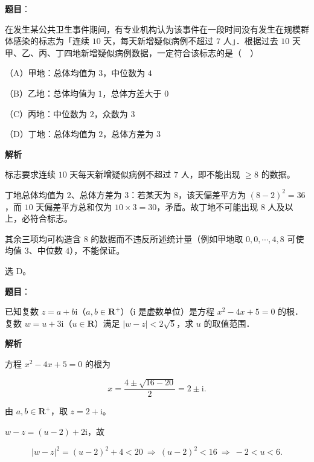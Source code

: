 \begin{answer}

\textbf{题目}：

在发生某公共卫生事件期间，有专业机构认为该事件在一段时间没有发生在规模群体感染的标志为「连续 $10$ 天，每天新增疑似病例不超过 $7$ 人」．根据过去 $10$ 天甲、乙、丙、丁四地新增疑似病例数据，一定符合该标志的是（　）

（A）甲地：总体均值为 $3$，中位数为 $4$

（B）乙地：总体均值为 $1$，总体方差大于 $0$

（C）丙地：中位数为 $2$，众数为 $3$

（D）丁地：总体均值为 $2$，总体方差为 $3$

\textbf{解析}

标志要求连续 $10$ 天每天新增疑似病例不超过 $7$ 人，即不能出现 $\geqslant8$ 的数据。

丁地总体均值为 $2$、总体方差为 $3$：若某天为 $8$，该天偏差平方为 $(8-2)^2=36$，而 $10$ 天偏差平方总和仅为 $10\times3=30$，矛盾。故丁地不可能出现 $8$ 人及以上，必符合标志。

其余三项均可构造含 $8$ 的数据而不违反所述统计量（例如甲地取 $0,0,\cdots,4,8$ 可使均值 $3$、中位数 $4$），不能保证。

选 D。


\end{answer}
\begin{answer}

\textbf{题目}：

已知复数 $z=a+b\mathrm i$（$a,b\in\mathbf R^+$）（$\mathrm i$ 是虚数单位）是方程 $x^2-4x+5=0$ 的根．复数 $w=u+3\mathrm i$（$u\in\mathbf R$）满足 $|w-z|<2\sqrt5$，求 $u$ 的取值范围．

\textbf{解析}

方程 $x^2-4x+5=0$ 的根为

\nopagebreak[4]
\[x=\frac{4\pm\sqrt{16-20}}{2}=2\pm\mathrm i .\]

由 $a,b\in\mathbf R^+$，取 $z=2+\mathrm i$。

$w-z=(u-2)+2\mathrm i$，故

\nopagebreak[4]
\[|w-z|^2=(u-2)^2+4<20
\ \Longrightarrow\ (u-2)^2<16
\ \Longrightarrow\ -2<u<6 .\]


\end{answer}
